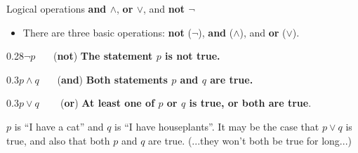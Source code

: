 \documentclass[12pt,aspectratio=1610, handout]{beamer}
\begin{document}
\begin{frame}{Logical operations \textbf{and $\land$}, \textbf{or $\lor$}, and \textbf{not $\neg$}}
	\begin{itemize}
	\item There are three basic operations: \textbf{not} ($\neg$), \textbf{and} ($\wedge$), and \textbf{or} ($\vee$). \p
	\end{itemize}
	
	\begin{blockz}{0.28}{$\neg p$ \hfill ~~~(\textbf{not})}
		\textbf{The statement $p$ is not true. }
	\end{blockz}	
	\p	
	\begin{blockz}{0.3}{$p \land q$ \hfill ~~~(\textbf{and})}
	\textbf{Both statements $p$ and $q$ are true. }
	\end{blockz}
	\p
	\begin{blockz}{0.3}{$p \lor q$ \hfill~~~ (\textbf{or})}
		\textbf{At least one of $p$ or $q$ is true, or both are true}.
	\end{blockz}\p
		
	\begin{example}
	$p$ is ``I have a cat'' and $q$ is ``I have houseplants''. It may be the case that $p \vee q$ is true, and also that both $p$ and $q$ are true. (...they won't both be true for long...)
	
\end{example}

\end{frame}
\end{document}
